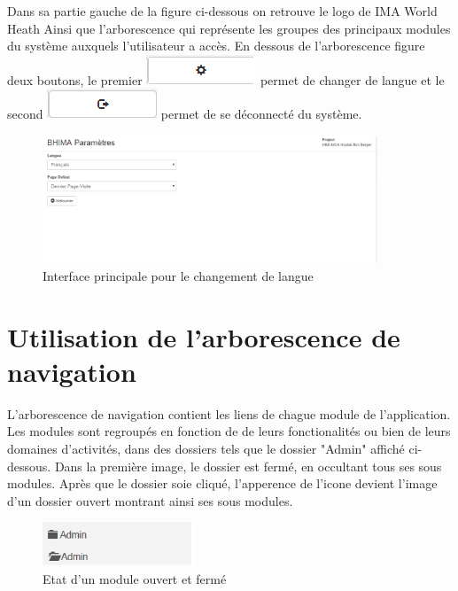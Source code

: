 \documentclass[12pt,a4paper]{report}
\begin{document}
Dans sa partie gauche de la figure ci-dessous on retrouve le logo de IMA World Heath Ainsi que l'arborescence qui représente les groupes des principaux modules du système auxquels l'utilisateur a accès. En dessous de l'arborescence figure deux boutons, le premier \includegraphics[scale=0.5]{pic/lang.png} permet de changer de langue et le second \includegraphics[scale=0.5]{pic/logout.png} permet de se déconnecté du système.

\begin{figure}[h]
\begin{center}
\includegraphics[width=10cm]{pic/changeLang.png}
\end{center}
\caption{Interface principale pour le changement de langue}
\label{Interface principale pour le changement de langue}
\end{figure} 

\section{Utilisation de l'arborescence de navigation}
L'arborescence de navigation contient les liens de chague module de l'application. Les modules sont regroupés en fonction de de leurs fonctionalités ou bien de leurs domaines d'activités, dans des dossiers tels que le dossier "Admin" affiché ci-dessous. Dans la première image, le dossier est fermé, en occultant tous ses sous modules. Après que le dossier soie cliqué, l'apperence de l'icone devient l'image d'un dossier ouvert montrant ainsi ses sous modules.

\begin{figure}[h]
\begin{center}
\includegraphics[width=4.5cm]{pic/folder_open_closed.png}
\end{center}
\caption{Etat d'un module ouvert et fermé}
\label{Etat d'un module ouvert et fermé}
\end{figure} 
\end{document}

